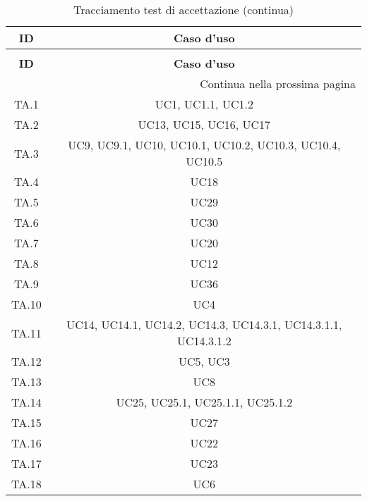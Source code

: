 \bgroup
\begin{adjustwidth}{-0.5cm}{-0.5cm}
	\centering
  \begin{longtable}{|c|c|}
		\caption{Tracciamento test di accettazione}
  	\label{tab:tracciamento-test-accettazione} \\
    \hline
		\textbf{ID} & \textbf{Caso d'uso} \\ 
		\hline
		\endfirsthead

		\caption[]{Tracciamento test di accettazione (continua)} \\
		\hline
		\textbf{ID} & \textbf{Caso d'uso} \\ 
		\hline
		\endhead

		\hline
		\multicolumn{2}{|r|}{{Continua nella prossima pagina}} \\ 
		\hline
		\endfoot

		\hline
		\endlastfoot

    TA.1 & UC1, UC1.1, UC1.2\\
		\hline TA.2 & UC13, UC15, UC16, UC17\\
		\hline TA.3 & UC9, UC9.1, UC10, UC10.1, UC10.2, UC10.3, UC10.4, UC10.5\\
		\hline TA.4 & UC18\\
		\hline TA.5 & UC29\\
		\hline TA.6 & UC30\\
		\hline TA.7 & UC20\\
		\hline TA.8 & UC12\\
		\hline TA.9 & UC36\\
		\hline TA.10 & UC4\\
		\hline TA.11 & UC14, UC14.1, UC14.2, UC14.3, UC14.3.1, UC14.3.1.1, UC14.3.1.2\\
		\hline TA.12 & UC5, UC3\\
		\hline TA.13 & UC8\\
		\hline TA.14 & UC25, UC25.1, UC25.1.1, UC25.1.2\\
		\hline TA.15 & UC27\\
		\hline TA.16 & UC22\\
		\hline TA.17 & UC23\\
		\hline TA.18 & UC6\\
  \end{longtable}
\end{adjustwidth}
\egroup
